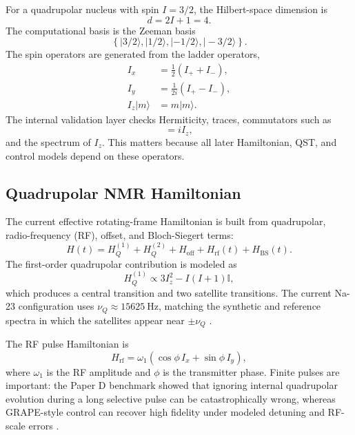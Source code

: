 \documentclass[11pt,a4paper]{article}
\begin{document}
For a quadrupolar nucleus with spin $I=3/2$, the Hilbert-space dimension is
\begin{equation}
  d = 2I + 1 = 4.
\end{equation}
The computational basis is the Zeeman basis
\begin{equation}
  \left\{ |3/2\rangle, |1/2\rangle, |-1/2\rangle, |-3/2\rangle \right\}.
\end{equation}
The spin operators are generated from the ladder operators,
\begin{align}
  I_x &= \frac{1}{2}(I_+ + I_-),\\
  I_y &= \frac{1}{2i}(I_+ - I_-),\\
  I_z |m\rangle &= m |m\rangle.
\end{align}
The internal validation layer checks Hermiticity, traces, commutators such as
\begin{equation}
  [I_x,I_y] = i I_z,
\end{equation}
and the spectrum of $I_z$.  This matters because all later Hamiltonian, QST, and
control models depend on these operators.

\subsection{Quadrupolar NMR Hamiltonian}

The current effective rotating-frame Hamiltonian is built from quadrupolar,
radio-frequency (RF), offset, and Bloch-Siegert terms:
\begin{equation}
  H(t) =
  H_{Q}^{(1)} + H_{Q}^{(2)} + H_{\mathrm{off}}
  + H_{\mathrm{rf}}(t) + H_{\mathrm{BS}}(t).
\end{equation}
The first-order quadrupolar contribution is modeled as
\begin{equation}
  H_{Q}^{(1)} \propto 3I_z^2 - I(I+1)\mathbb{I},
\end{equation}
which produces a central transition and two satellite transitions.  The current
Na-23 configuration uses $\nu_Q \approx 15625~\mathrm{Hz}$, matching the
synthetic and reference spectra in which the satellites appear near
$\pm\nu_Q$ \citep{na23_relaxometry_2023,spin32_algebraic_2004,
spin32_qlogic_qst_2005,quadrupolar_qip_2012}.

The RF pulse Hamiltonian is
\begin{equation}
  H_{\mathrm{rf}} =
  \omega_1(\cos\phi\,I_x+\sin\phi\,I_y),
\end{equation}
where $\omega_1$ is the RF amplitude and $\phi$ is the transmitter phase.  Finite
pulses are important: the Paper D benchmark showed that ignoring internal
quadrupolar evolution during a long selective pulse can be catastrophically
wrong, whereas GRAPE-style control can recover high fidelity under modeled
detuning and RF-scale errors \citep{spin32_qlogic_qst_2005,grape_nmr_control_2005}.
\end{document}
